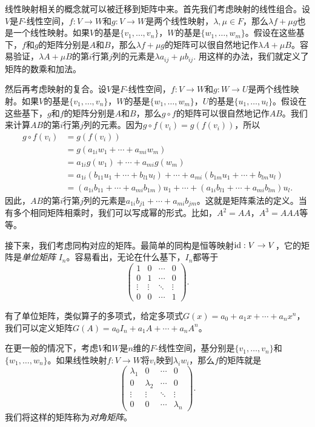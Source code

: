 线性映射相关的概念就可以被迁移到矩阵中来。首先我们考虑映射的线性组合。设$V$是$F$-线性空间，$f:V\to W$和$g:V\to W$是两个线性映射，$\lambda,\mu\in F$，那么$\lambda f+\mu g$也是一个线性映射。如果$V$的基是$\{v_1,\dots,v_n\}$，$W$的基是$\{w_1,\dots,w_m\}$。假设在这些基下，$f$和$g$的矩阵分别是$A$和$B$，那么$\lambda f+\mu g$的矩阵可以很自然地记作$\lambda A+\mu B$。容易验证，$\lambda A+\mu B$的第$i$行第$j$列的元素是$\lambda a_{ij}+\mu b_{ij}$. 用这样的办法，我们就定义了矩阵的数乘和加法。


然后再考虑映射的复合。设$V$是$F$-线性空间，$f:V\to W$和$g:W\to U$是两个线性映射。如果$V$的基是$\{v_1,\dots,v_n\}$，$W$的基是$\{w_1,\dots,w_m\}$，$U$的基是$\{u_1,\dots,u_l\}$。假设在这些基下，$g$和$f$的矩阵分别是$A$和$B$，那么$g\circ f$的矩阵可以很自然地记作$AB$。我们来计算$AB$的第$i$行第$j$列的元素。因为$g\circ f(v_i)=g(f(v_i))$，所以
\begin{align*}
    g\circ f(v_i)&=g(f(v_i))\\
    &=g(a_{1i}w_1+\cdots+a_{mi}w_m)\\
    &=a_{1i}g(w_1)+\cdots+a_{mi}g(w_m)\\
    &=a_{1i}(b_{11}u_1+\cdots+b_{l1}u_l)+\cdots+a_{mi}(b_{1m}u_1+\cdots+b_{lm}u_l)\\
    &=(a_{1i}b_{11}+\cdots+a_{mi}b_{1m})u_1+\cdots+(a_{1i}b_{l1}+\cdots+a_{mi}b_{lm})u_l.
\end{align*}
因此，$AB$的第$i$行第$j$列的元素是$a_{1i}b_{j1}+\cdots+a_{mi}b_{jm}$。这就是矩阵乘法的定义。当有多个相同矩阵相乘时，我们可以写成幂的形式。比如，$A^2=AA$，$A^3=AAA$等等。

接下来，我们考虑同构对应的矩阵。最简单的同构是恒等映射$\mathrm{id}:V\to V$，它的矩阵是\emph{单位矩阵} $I_n$。容易看出，无论在什么基下，$I_n$都等于
\[\begin{pmatrix}
1&0&\cdots&0\\
0&1&\cdots&0\\
\vdots&\vdots&\ddots&\vdots\\
0&0&\cdots&1
\end{pmatrix}.\]

有了单位矩阵，类似算子的多项式，给定多项式$G(x)=a_0+a_1x+\cdots+a_nx^n$，我们可以定义矩阵$G(A)=a_0I_n+a_1A+\cdots+a_nA^n$。

在更一般的情况下，考虑$V$和$W$是$n$维的$F$-线性空间，基分别是$\{v_1,\dots,v_n\}$和$\{w_1,\dots,w_n\}$。如果线性映射$f:V\to W$将$v_i$映到$\lambda_i w_i$，那么$f$的矩阵就是
\[\begin{pmatrix}
\lambda_1&0&\cdots&0\\
0&\lambda_2&\cdots&0\\
\vdots&\vdots&\ddots&\vdots\\
0&0&\cdots&\lambda_n
\end{pmatrix}.\]
我们将这样的矩阵称为\emph{对角矩阵}。

